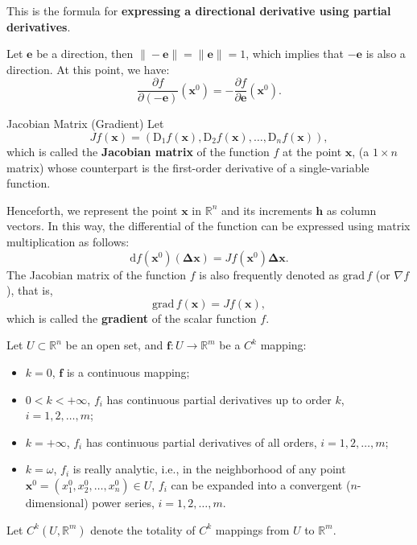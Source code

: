 \documentclass[11pt]{../../TexTemplate/elegantbook}
\begin{document}
This is the formula for \textbf{expressing a directional derivative using partial derivatives}.


\begin{note}
    Let \(\mathbf{e}\) be a direction, then \(\|-\mathbf{e}\| = \|\mathbf{e}\| = 1\), 
    which implies that \(-\mathbf{e}\) is also a direction. At this point, we have:
    \[
    \frac{\partial f}{\partial (-\mathbf{e})}(\mathbf{x}^{0}) = -\frac{\partial f}{\partial \mathbf{e}}(\mathbf{x}^{0}).
    \]
\end{note}



\begin{definition}{Jacobian Matrix (Gradient)}
    Let
    \[
    Jf(\mathbf{x}) = (\mathrm{D}_1 f(\mathbf{x}), \mathrm{D}_2 f(\mathbf{x}), \dots, \mathrm{D}_n f(\mathbf{x})),
    \]
    which is called the \textbf{Jacobian matrix} of the function \( f \) at the point \( \mathbf{x} \), 
    (a \( 1 \times n \) matrix) whose counterpart is the first-order derivative of a single-variable function.

    Henceforth, we represent the point \(\mathbf{x}\) in \( \mathbb{R}^n \) 
    and its increments \(\mathbf{h}\) as column vectors.
    In this way, the differential of the function can be expressed using matrix multiplication as follows:
    \[
    \mathrm{d}f(\mathbf{x}^{0})(\mathbf{\Delta x}) = Jf(\mathbf{x}^{0}) \mathbf{\Delta x}.
    \]
    The Jacobian matrix of the function \( f \) is also frequently denoted as 
    \(\mathrm{grad}\,f\) (or \(\nabla f\)), that is,
    \[
    \mathrm{grad}\,f(\mathbf{x}) = Jf(\mathbf{x}),
    \]
    which is called the \textbf{gradient} of the scalar function \( f \).
\end{definition}

\begin{note}
    Let \(U \subset \mathbb{R}^n\) be an open set, and \(\mathbf{f}: U \to \mathbb{R}^m\) be a \(C^k\) mapping:  
    \begin{itemize}
        \item \(k = 0\), \(\mathbf{f}\) is a continuous mapping;
        \item \(0 < k < +\infty\), \(f_i\) has continuous partial derivatives up to order \(k\), \(i = 1, 2, \dots, m\);
        \item \(k = +\infty\), \(f_i\) has continuous partial derivatives of all orders, \(i = 1, 2, \dots, m\);
        \item \(k = \omega\), \(f_i\) is really analytic, i.e., 
            in the neighborhood of any point \(\mathbf{x}^0 = (x_1^0, x_2^0, \dots, x_n^0) \in U\), 
            \(f_i\) can be expanded into a convergent (\(n\)-dimensional) power series, \(i = 1, 2, \dots, m\).
    \end{itemize}
    Let \(C^k(U, \mathbb{R}^m)\) denote the totality of \(C^k\) mappings from \(U\) to \(\mathbb{R}^m\).
\end{note}
\end{document}
